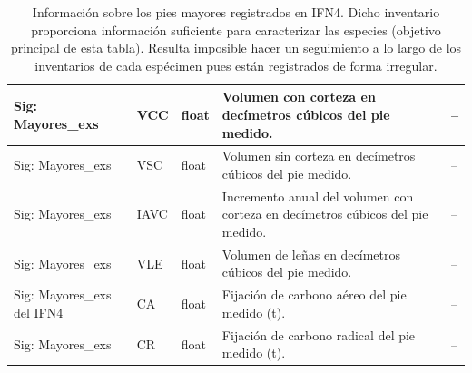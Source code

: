 \begin{table}[H]
{\begin{tabular}{|>{\centering\arraybackslash}m{1.8cm}|>{\centering\arraybackslash}m{3.5cm}|>{\centering\arraybackslash}m{2.5cm}|m{7cm}|>{\centering\arraybackslash}m{2cm}|}
\hline
Sig: Mayores\_exs & VCC & float & Volumen con corteza en decímetros cúbicos del pie medido. & -- \\
\hline
Sig: Mayores\_exs & VSC & float & Volumen sin corteza en decímetros cúbicos del pie medido. & -- \\
\hline
Sig: Mayores\_exs & IAVC & float & Incremento anual del volumen con corteza en decímetros cúbicos del pie medido. & -- \\
\hline
Sig: Mayores\_exs & VLE & float & Volumen de leñas en decímetros cúbicos del pie medido. & -- \\
\hline
Sig: Mayores\_exs del IFN4 & CA & float & Fijación de carbono aéreo del pie medido (t). & -- \\
\hline
Sig: Mayores\_exs & CR & float & Fijación de carbono radical del pie medido (t). & -- \\
\hline
\end{tabular}%
}
\caption{Información sobre los pies mayores registrados en IFN4. Dicho inventario proporciona información suficiente para caracterizar las especies (objetivo principal de esta tabla). Resulta imposible hacer un seguimiento a lo largo de los inventarios de cada espécimen pues están registrados de forma irregular.}
\label{tab:parcela_inventario_especie_arbol}
\end{table}





